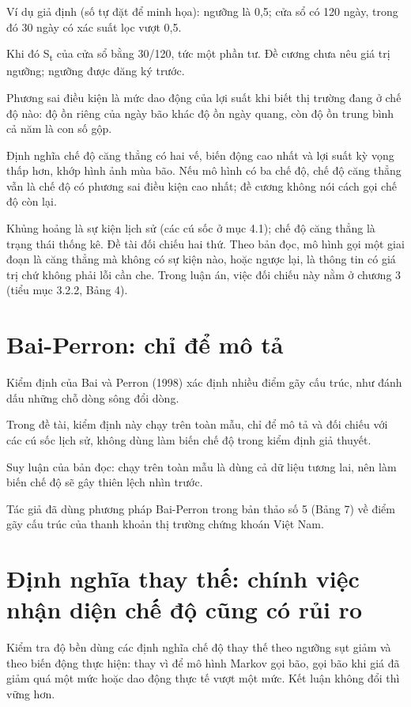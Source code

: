 \begin{tcolorbox}[breakable]
Ví dụ giả định (số tự đặt để minh họa): ngưỡng là 0,5; cửa sổ có 120 ngày, trong đó 30 ngày có xác suất lọc vượt 0,5.

Khi đó S\textsubscript{t} của cửa sổ bằng 30/120, tức một phần tư. Đề cương chưa nêu giá trị ngưỡng; ngưỡng được đăng ký trước.
\end{tcolorbox}

Phương sai điều kiện là mức dao động của lợi suất khi biết thị trường đang ở chế độ nào: độ ồn riêng của ngày bão khác độ ồn ngày quang, còn độ ồn trung bình cả năm là con số gộp.

Định nghĩa chế độ căng thẳng có hai vế, biến động cao nhất và lợi suất kỳ vọng thấp hơn, khớp hình ảnh mùa bão. Nếu mô hình có ba chế độ, chế độ căng thẳng vẫn là chế độ có phương sai điều kiện cao nhất; đề cương không nói cách gọi chế độ còn lại.

Khủng hoảng là sự kiện lịch sử (các cú sốc ở mục 4.1); chế độ căng thẳng là trạng thái thống kê. Đề tài đối chiếu hai thứ. Theo bản đọc, mô hình gọi một giai đoạn là căng thẳng mà không có sự kiện nào, hoặc ngược lại, là thông tin có giá trị chứ không phải lỗi cần che. Trong luận án, việc đối chiếu này nằm ở chương 3 (tiểu mục 3.2.2, Bảng 4).

\section{Bai-Perron: chỉ để mô tả}

Kiểm định của Bai và Perron (1998) xác định nhiều điểm gãy cấu trúc, như đánh dấu những chỗ dòng sông đổi dòng.

Trong đề tài, kiểm định này chạy trên toàn mẫu, chỉ để mô tả và đối chiếu với các cú sốc lịch sử, không dùng làm biến chế độ trong kiểm định giả thuyết.

Suy luận của bản đọc: chạy trên toàn mẫu là dùng cả dữ liệu tương lai, nên làm biến chế độ sẽ gây thiên lệch nhìn trước.

Tác giả đã dùng phương pháp Bai-Perron trong bản thảo số 5 (Bảng 7) về điểm gãy cấu trúc của thanh khoản thị trường chứng khoán Việt Nam.

\section{Định nghĩa thay thế: chính việc nhận diện chế độ cũng có rủi ro}

Kiểm tra độ bền dùng các định nghĩa chế độ thay thế theo ngưỡng sụt giảm và theo biến động thực hiện: thay vì để mô hình Markov gọi bão, gọi bão khi giá đã giảm quá một mức hoặc dao động thực tế vượt một mức. Kết luận không đổi thì vững hơn.

